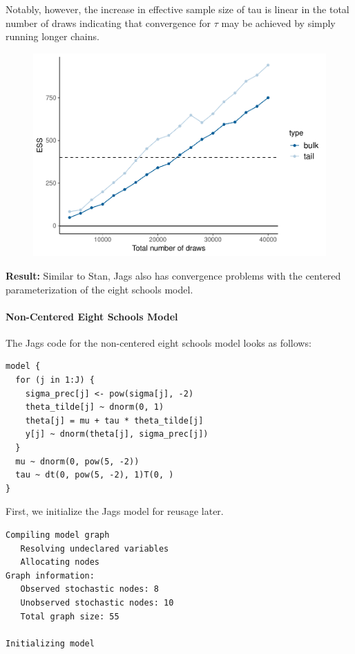 \documentclass[american,]{article}
\let\oldparagraph\paragraph
\renewcommand{\paragraph}[1]{\oldparagraph{#1}\mbox{}}
\begin{document}
Notably, however, the increase in effective sample size of tau is linear
in the total number of draws indicating that convergence for
$\tau$ may be achieved by simply running longer chains.

\begin{figure}[tp]
  \centering
  \includegraphics[width=0.6\linewidth]{graphics/change-ess-jags-cp-tau-longer-1.pdf}
\end{figure}

\textbf{Result:} Similar to Stan, Jags also has convergence problems
with the centered parameterization of the eight schools model.

\hypertarget{non-centered-eight-schools-model-2}{%
\paragraph{Non-Centered Eight Schools
Model}\label{non-centered-eight-schools-model-2}}

The Jags code for the non-centered eight schools model looks as follows:

\begin{verbatim}
model {
  for (j in 1:J) {
    sigma_prec[j] <- pow(sigma[j], -2)
    theta_tilde[j] ~ dnorm(0, 1)
    theta[j] = mu + tau * theta_tilde[j]
    y[j] ~ dnorm(theta[j], sigma_prec[j])
  }
  mu ~ dnorm(0, pow(5, -2))
  tau ~ dt(0, pow(5, -2), 1)T(0, )
}
\end{verbatim}

First, we initialize the Jags model for reusage later.

\begin{verbatim}
Compiling model graph
   Resolving undeclared variables
   Allocating nodes
Graph information:
   Observed stochastic nodes: 8
   Unobserved stochastic nodes: 10
   Total graph size: 55

Initializing model
\end{verbatim}
\end{document}
